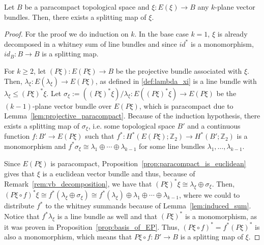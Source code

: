 \begin{proposition}\label{prop:splitting_map} Let $B$ be a paracompact topological space and $\xi:E(\xi)\to B$ any $k$-plane vector bundles. Then, there exists a splitting map of $\xi$.
\end{proposition}
\begin{proof} For the proof we do induction on $k$. In the base case $k=1$, $\xi$ is already decomposed in a whitney sum of line bundles and since $id^*$ is a monomorphism, $id_B:B\to B$ is a splitting map.

For $k\geq2$, let $(P\xi):E(P\xi)\to B$ be the projective bundle associated with $\xi$. Then, $\lambda_{\xi}:E(\lambda_{\xi})\to E(P\xi)$, as defined in \ref{def:lambda_xi} is a line bundle with $\lambda_{\xi}\leq(P\xi)^*\xi$. Let $\sigma_{\xi}:=((P\xi)^*\xi)/\lambda_{\xi}:E((P\xi)^*\xi)\to E(P\xi)$ be the $(k-1)$-plane vector bundle over $E(P\xi)$, which is paracompact due to Lemma~\ref{lem:projective_paracompact}. Because of the induction hypothesis, there exists a splitting map of $\sigma_{\xi}$, i.e. some topological space $B'$ and a continuous function $f:B'\to E(P\xi)$ such that $f^*:H^*(E(P\xi);\mathbb{Z}_2)\to H^*(B';\mathbb{Z}_2)$ is a monomorphism and $f^*\sigma_{\xi}\cong\lambda_1\oplus\cdots\oplus\lambda_{k-1}$ for some line bundles $\lambda_1,\ldots,\lambda_{k-1}$.

Since $E(P\xi)$ is paracompact, Proposition~\ref{prop:paracompact_is_euclidean} gives that $\xi$ is a euclidean vector bundle and thus, because of Remark~\ref{rem:vb_decomposition}, we have that $(P\xi)^*\xi\cong\lambda_{\xi}\oplus\sigma_{\xi}$. Then, $(P\xi\circ f)^*\xi\cong f^*(\lambda_{\xi}\oplus\sigma_{\xi})\cong f^*(\lambda_{\xi})\oplus\lambda_1\oplus\cdots\oplus\lambda_{k-1}$, where we could to distribute $f^*$ to the whitney summands because of Lemma~\ref{lem:induced_sum}. Notice that $f^*\lambda_{\xi}$ is a line bundle as well and that $(P\xi)^*$ is a monomorphism, as it was proven in Proposition~\ref{prop:basis_of_EP}. Thus, $(P\xi\circ f)^*=f^*(P\xi)^*$ is also a monomorphism, which means that $P\xi\circ f:B'\to B$ is a splitting map of $\xi$.
\end{proof}

